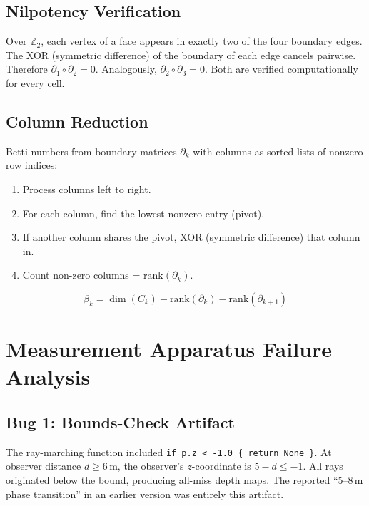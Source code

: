 \documentclass[11pt,a4paper]{article}
\theoremstyle{remark}
\begin{document}
\subsection{Nilpotency Verification}

Over $\mathbb{Z}_2$, each vertex of a face appears in exactly two of the four boundary edges. The XOR (symmetric difference) of the boundary of each edge cancels pairwise. Therefore $\partial_1 \circ \partial_2 = 0$. Analogously, $\partial_2 \circ \partial_3 = 0$. Both are verified computationally for every cell.

\subsection{Column Reduction}

Betti numbers from boundary matrices $\partial_k$ with columns as sorted lists of nonzero row indices:

\begin{enumerate}[leftmargin=*]
    \item Process columns left to right.
    \item For each column, find the lowest nonzero entry (pivot).
    \item If another column shares the pivot, XOR (symmetric difference) that column in.
    \item Count non-zero columns = $\text{rank}(\partial_k)$.
\end{enumerate}

\begin{equation}
    \beta_k = \dim(C_k) - \text{rank}(\partial_k) - \text{rank}(\partial_{k+1})
\end{equation}

\section{Measurement Apparatus Failure Analysis}
\label{app:failure}

\subsection{Bug 1: Bounds-Check Artifact}

The ray-marching function included \texttt{if p.z < -1.0 \{ return None \}}. At observer distance $d \geq 6$\,m, the observer's $z$-coordinate is $5 - d \leq -1$. All rays originated below the bound, producing all-miss depth maps. The reported ``5--8\,m phase transition'' in an earlier version was entirely this artifact.
\end{document}
